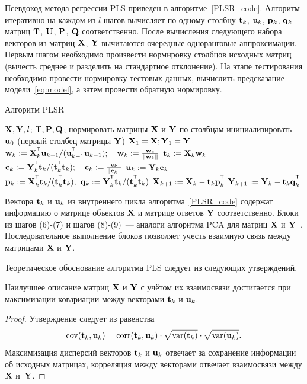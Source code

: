 Псевдокод метода регрессии PLS приведен в алгоритме~\ref{PLSR_code}.
Алгоритм итеративно на каждом из $l$ шагов вычисляет по одному столбцу $\mathbf{t}_k$, $\mathbf{u}_k$, $\mathbf{p}_k$, $\mathbf{q}_k$ матриц $\mathbf{T}$, $\mathbf{U}$, $\mathbf{P}$, $\mathbf{Q}$ соответственно. После вычисления следующего набора векторов из матриц $\mathbf{X}$, $\mathbf{Y}$ вычитаются очередные одноранговые аппроксимации. 
Первым шагом необходимо произвести нормировку столбцов исходных матриц (вычесть среднее и разделить на стандартное отклонение).
На этапе тестирования необходимо провести нормировку тестовых данных, вычислить предсказание модели~\ref{eq:model}, а затем провести обратную нормировку.

\begin{algorithm}[h]
	\caption{Алгоритм PLSR}
	\label{PLSR_code}
	\begin{algorithmic}[1]
		\REQUIRE $\mathbf{X}, \mathbf{Y}, l$;
		\ENSURE $\mathbf{T}, \mathbf{P}, \mathbf{Q}$;
		\STATE нормировать матрицы $\mathbf{X}$ и $\mathbf{Y}$ по столбцам
		\STATE инициализировать $\mathbf{u}_0$ (первый столбец матрицы $\mathbf{Y}$)
		\STATE $\mathbf{X}_1 = \mathbf{X}; \mathbf{Y}_1 = \mathbf{Y}$
		\REPEAT
		\vspace{0.1cm}
		\STATE $\bw_k := \bX_k^{\T} \bu_{k-1} / (\bu_{k-1}^{\T} \bu_{k-1}); \quad \bw_k: = \frac{\bw_k}{\| \bw_k \|}$
		\vspace{0.1cm}
		\STATE $\mathbf{t}_k := \mathbf{X}_k \mathbf{w}_k$
		\vspace{0.1cm}
		\STATE $\bc_k := \bY_k^{\T} \bt_k / (\bt_k^{\T} \bt_k); \quad \bc_k: = \frac{\bc_k}{\| \bc_k \|}$
		\vspace{0.1cm}
		\STATE $\mathbf{u}_k := \mathbf{Y}_k \mathbf{c}_k$
		\vspace{0.1cm}
		\STATE $\bp_k:= \bX_k^{\T}\bt_k/(\bt_k^{\T}\bt_k),\ 
		\bq_k := \bY_k^{\T}\bt_k/(\bt_k^{\T}\bt_k)$
		\vspace{0.2cm}
		\STATE $\bX_{k+1} :=  \bX_k - \bt_k \bp_k^{\T}$
		\vspace{0.2cm}
		\STATE $\bY_{k + 1} :=  \bY_k - \bt_k \bq_k^{\T}$ 
		\ENDFOR
	\end{algorithmic}
\end{algorithm}

Вектора $\mathbf{t}_k$ и $\mathbf{u}_k$ из внутреннего цикла алгоритма~\ref{PLSR_code}
содержат информацию о матрице объектов $\mathbf{X}$ и матрице ответов $\mathbf{Y}$ соответственно. 
Блоки из шагов (6)-(7) и шагов (8)-(9)~--- аналоги алгоритма PCA для матриц $\mathbf{X}$ и $\mathbf{Y}$~\cite{geladi1988pls}. 
Последовательное выполнение блоков позволяет учесть взаимную связь между матрицами $\mathbf{X}$ и $\mathbf{Y}$.

Теоретическое обоснование алгоритма PLS следует из следующих утверждений.
\begin{statement}
	Наилучшее описание матриц $\mathbf{X}$ и $\mathbf{Y}$ с учётом их взаимосвязи достигается при максимизации ковариации между векторами $\mathbf{t}_k$ и $\mathbf{u}_k$. 
\end{statement}
\begin{proof}
Утверждение следует из равенства
\[
\text{cov} (\mathbf{t}_k, \mathbf{u}_k) = \text{corr} (\mathbf{t}_k, \mathbf{u}_k) \cdot \sqrt{\text{var}(\mathbf{t}_k)} \cdot \sqrt{\text{var}(\mathbf{u}_k)}.
\]
Максимизация дисперсий векторов $\mathbf{t}_k$ и $\mathbf{u}_k$ отвечает за сохранение информации об исходных матрицах, 
корреляция между векторами отвечает взаимосвязи между $\mathbf{X}$ и~$\mathbf{Y}$. 
\end{proof}

